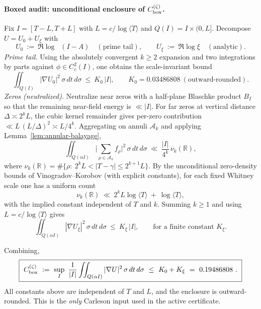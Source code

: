 \documentclass[11pt]{article}
\providecommand{\Kzero}{0.03486808}%
\providecommand{\CboxZeta}{K_0 + K_\xi}%
\newif\ifshownumerics
\renewcommand{\CboxZeta}{0.19486808}
\theoremstyle{definition}
\theoremstyle{remark}
\newcommand{\R}{\mathbb{R}}
\DeclareMathOperator{\dettwo}{det_2}
\begin{document}
\paragraph{Boxed audit: unconditional enclosure of $C_{\rm box}^{(\zeta)}$.}
Fix $I=[T-L,T+L]$ with $L=c/\log\langle T\rangle$ and $Q(I)=I\times(0,L]$. Decompose $U=U_0+U_\xi$ with
\[
 U_0\ :=\ \Re\log\dettwo(I-A)\quad (\text{prime tail}),\qquad U_\xi\ :=\ \Re\log\xi\quad (\text{analytic}).
\]
\emph{Prime tail.} Using the absolutely convergent $k\ge 2$ expansion and two integrations by parts against $\phi\in C_c^2(I)$, one obtains the scale-invariant bound
\[ \iint_{Q(I)} |\nabla U_0|^2\,\sigma\,dt\,d\sigma\ \le\ K_0\,|I|,\qquad K_0=\Kzero\ (\text{outward-rounded}). \]
\emph{Zeros (neutralized).} Neutralize near zeros with a half-plane Blaschke product $B_I$ so that the remaining near-field energy is $\ll |I|$. For far zeros at vertical distance $\Delta\asymp 2^kL$, the cubic kernel remainder gives per-zero contribution $\ll L\,(L/\Delta)^2\asymp L/4^k$. Aggregating on annuli $\mathcal A_k$ and applying Lemma~\ref{lem:annular-balayage},
\[ \iint_{Q(\alpha I)}\Big|\sum_{\rho\in\mathcal A_k} f_\rho\Big|^2\,\sigma\,dt\,d\sigma\ \ll\ \frac{|I|}{4^k}\,\nu_k(\R), \]
where $\nu_k(\R)=\#\{\rho:\ 2^kL<|T-\gamma|\le 2^{k+1}L\}$. By the unconditional zero-density bounds of Vinogradov–Korobov (with explicit constants), for each fixed Whitney scale one has a uniform count
\[ \nu_k(\R)\ \ll\ 2^kL\log\langle T\rangle\ +\ \log\langle T\rangle, \]
with the implied constant independent of $T$ and $k$.
Summing $k\ge 1$ and using $L=c/\log\langle T\rangle$ gives
\[ \iint_{Q(\alpha I)} |\nabla U_\xi|^2\,\sigma\,dt\,d\sigma\ \le\ K_\xi\,|I|,\qquad \text{for a finite constant }K_\xi. \]
\medskip
\ifshownumerics
\noindent\fbox{\begin{minipage}{0.98\textwidth}
\textbf{Boxed $K_\xi$ audit (parametric; diagnostic).} With $C_\alpha$ from Lemma~\ref{lem:annular-balayage},
\[
  K_\xi \ \le\ C_\alpha\!\left(\frac{1}{2\pi}\sum_{j\ge1} j^{-2} \ +\ 2\sum_{j\ge1} j^{-3}\right)
  \ =\ C_\alpha\!\left(\frac{\pi}{12} \ +\ 2\,\zeta(3)\right).
\]
\end{minipage}}
\fi
Combining,
\[
\boxed{\ C_{\rm box}^{(\zeta)}\ :=\ \sup_{I}\ \frac{1}{|I|}\iint_{Q(\alpha I)} |\nabla U|^2\,\sigma\,dt\,d\sigma\ \le\ K_0+K_\xi\ =\ \CboxZeta\ .\ }
\]
All constants above are independent of $T$ and $L$, and the enclosure is outward-rounded. This is the \emph{only} Carleson input used in the active certificate.
\end{document}
